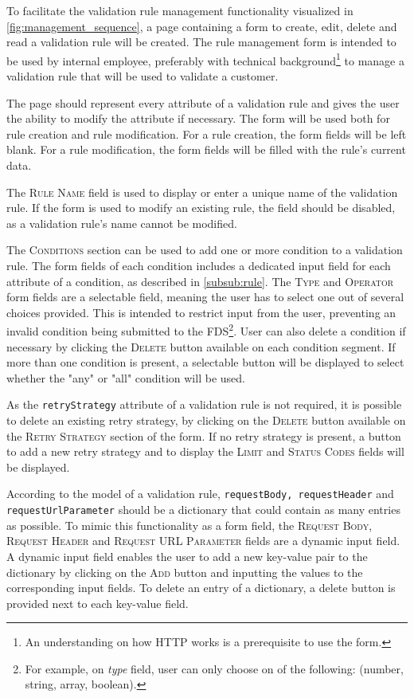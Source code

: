 To facilitate the validation rule management functionality visualized in \autoref{fig:management_sequence}, a page containing a form to create, edit, delete and read a validation rule will be created. The rule management form is intended to be used by internal employee, preferably with technical background\footnote{An understanding on how HTTP works is a prerequisite to use the form.} to manage a validation rule that will be used to validate a customer.

The page should represent every attribute of a validation rule and gives the user the ability to modify the attribute if necessary. The form will be used both for rule creation and rule modification. For a rule creation, the form fields will be left blank. For a rule modification, the form fields will be filled with the rule's current data. 

The \textsc{Rule Name} field is used to display or enter a unique name of the validation rule. If the form is used to modify an existing rule, the field should be disabled, as a validation rule's name cannot be modified. 

The \textsc{Conditions} section can be used to add one or more condition to a validation rule. The form fields of each condition includes a dedicated input field for each attribute of a condition, as described in \autoref{subsub:rule}. The \textsc{Type} and \textsc{Operator} form fields are a selectable field, meaning the user has to select one out of several choices provided. This is intended to restrict input from the user, preventing an invalid condition being submitted to the FDS\footnote{For example, on \emph{type} field, user can only choose on of the following: (number, string, array, boolean).}. User can also delete a condition if necessary by clicking the \textsc{Delete} button available on each condition segment. If more than one condition is present, a selectable button will be displayed to select whether the "any" or "all" condition will be used. 

As the \verb;retryStrategy; attribute of a validation rule is not required, it is possible to delete an existing retry strategy, by clicking on the \textsc{Delete} button available on the \textsc{Retry Strategy} section of the form. If no retry strategy is present, a button to add a new retry strategy and to display the \textsc{Limit} and \textsc{Status Codes} fields will be displayed.

According to the model of a validation rule, \verb;requestBody, requestHeader; and \verb;requestUrlParameter; should be a dictionary that could contain as many entries as possible. To mimic this functionality as a form field, the \textsc{Request Body, Request Header} and \textsc{Request URL Parameter} fields are a dynamic input field. A dynamic input field enables the user to add a new key-value pair to the dictionary by clicking on the \textsc{Add} button and inputting the values to the corresponding input fields. To delete an entry of a dictionary, a delete button is provided next to each key-value field. 

